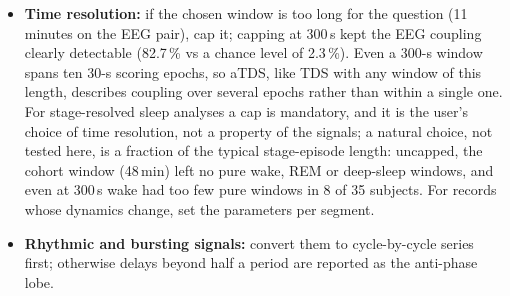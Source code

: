 \documentclass[11pt,a4paper]{article}
\begin{document}
\begin{itemize}
\item \textbf{Time resolution:} if the chosen window is too long for the question (11 minutes on the EEG pair), cap it; capping at 300\,s kept the EEG coupling clearly detectable (82.7\,\% vs a chance level of 2.3\,\%). Even a 300-s window spans ten 30-s scoring epochs, so aTDS, like TDS with any window of this length, describes coupling over several epochs rather than within a single one. For stage-resolved sleep analyses a cap is mandatory, and it is the user's choice of time resolution, not a property of the signals; a natural choice, not tested here, is a fraction of the typical stage-episode length: uncapped, the cohort window (48\,min) left no pure wake, REM or deep-sleep windows, and even at 300\,s wake had too few pure windows in 8 of 35 subjects. For records whose dynamics change, set the parameters per segment.
\item \textbf{Rhythmic and bursting signals:} convert them to cycle-by-cycle series first; otherwise delays beyond half a period are reported as the anti-phase lobe.
\end{itemize}
\end{document}
